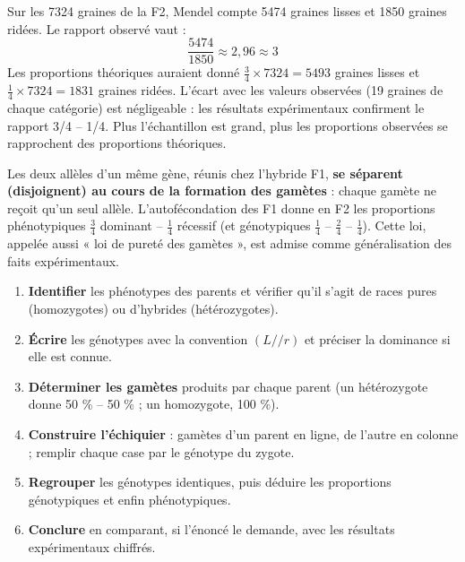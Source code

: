 \documentclass[11pt]{article}
\begin{document}
\begin{exemplebox}
Sur les \num{7324} graines de la F2, Mendel compte \num{5474} graines lisses et \num{1850} graines ridées. Le rapport observé vaut :
\[ \frac{5474}{1850} \approx 2,96 \approx 3 \]
Les proportions théoriques auraient donné $\frac{3}{4} \times 7324 = \num{5493}$ graines lisses et $\frac{1}{4} \times 7324 = \num{1831}$ graines ridées. L'écart avec les valeurs observées (19 graines de chaque catégorie) est négligeable : les résultats expérimentaux confirment le rapport 3/4 -- 1/4. Plus l'échantillon est grand, plus les proportions observées se rapprochent des proportions théoriques.
\end{exemplebox}

\begin{propriete}
Les deux allèles d'un même gène, réunis chez l'hybride F1, \textbf{se séparent (disjoignent) au cours de la formation des gamètes} : chaque gamète ne reçoit qu'un seul allèle. L'autofécondation des F1 donne en F2 les proportions phénotypiques $\frac{3}{4}$ dominant -- $\frac{1}{4}$ récessif (et génotypiques $\frac{1}{4}$ -- $\frac{2}{4}$ -- $\frac{1}{4}$). Cette loi, appelée aussi « loi de pureté des gamètes », est admise comme généralisation des faits expérimentaux.
\end{propriete}

\begin{methode}
\begin{enumerate}
\item \textbf{Identifier} les phénotypes des parents et vérifier qu'il s'agit de races pures (homozygotes) ou d'hybrides (hétérozygotes).
\item \textbf{Écrire} les génotypes avec la convention $(L//r)$ et préciser la dominance si elle est connue.
\item \textbf{Déterminer les gamètes} produits par chaque parent (un hétérozygote donne 50 \% -- 50 \% ; un homozygote, 100 \%).
\item \textbf{Construire l'échiquier} : gamètes d'un parent en ligne, de l'autre en colonne ; remplir chaque case par le génotype du zygote.
\item \textbf{Regrouper} les génotypes identiques, puis déduire les proportions génotypiques et enfin phénotypiques.
\item \textbf{Conclure} en comparant, si l'énoncé le demande, avec les résultats expérimentaux chiffrés.
\end{enumerate}
\end{methode}
\end{document}
